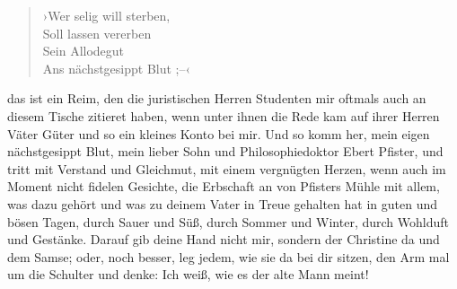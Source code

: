 \begin{verse}
›Wer selig will sterben,\\
Soll lassen vererben\\
Sein Allodegut\\
Ans nächstgesippt Blut ;–‹
\end{verse}
\noindent
das ist ein Reim,
den die juristischen Herren Studenten mir oftmals auch an diesem
Tische zitieret haben, wenn unter ihnen die Rede kam auf ihrer
Herren Väter Güter und so ein kleines Konto bei mir. Und so komm
her, mein eigen nächstgesippt Blut, mein lieber Sohn und
Philosophiedoktor Ebert Pfister, und tritt mit Verstand und
Gleichmut, mit einem vergnügten Herzen, wenn auch im Moment nicht
fidelen Gesichte, die Erbschaft an von Pfisters Mühle mit allem,
was dazu gehört und was zu deinem Vater in Treue gehalten hat in
guten und bösen Tagen, durch Sauer und Süß, durch Sommer und
Winter, durch Wohlduft und Gestänke. Darauf gib deine Hand nicht
mir, sondern der Christine da und dem Samse; oder, noch besser, leg
jedem, wie sie da bei dir sitzen, den Arm mal um die Schulter und
denke: Ich weiß, wie es der alte Mann meint!

